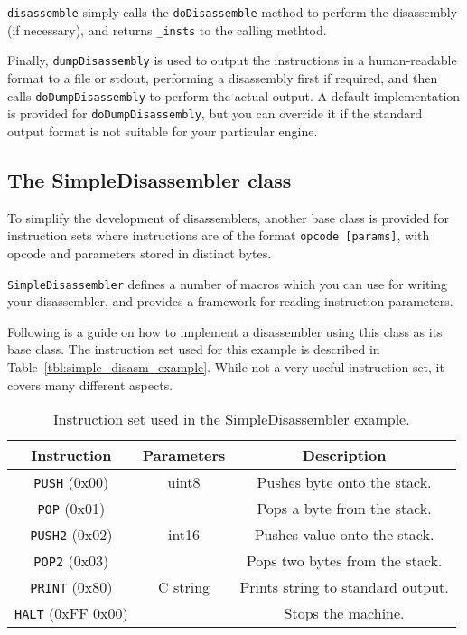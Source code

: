 \verb+disassemble+ simply calls the \verb+doDisassemble+ method to perform the disassembly (if necessary), and returns \verb+_insts+ to the calling methtod.

Finally, \verb+dumpDisassembly+ is used to output the instructions in a human-readable format to a file or stdout, performing a disassembly first if required, and then calls \verb+doDumpDisassembly+ to perform the actual output. A default implementation is provided for \verb+doDumpDisassembly+, but you can override it if the standard output format is not suitable for your particular engine.

\subsection{The SimpleDisassembler class}
To simplify the development of disassemblers, another base class is provided for instruction sets where instructions are of the format \verb+opcode [params]+, with opcode and parameters stored in distinct bytes.

\verb+SimpleDisassembler+ defines a number of macros which you can use for writing your disassembler, and provides a framework for reading instruction parameters.

Following is a guide on how to implement a disassembler using this class as its base class. The instruction set used for this example is described in Table~\vref{tbl:simple_disasm_example}. While not a very useful instruction set, it covers many different aspects.

\begin{table}[!hpbt]
\centering
\begin{tabular}{c | c | c}
Instruction & Parameters & Description \\
\hline
\verb+PUSH+ (0x00) & uint8 & Pushes byte onto the stack.\\
\verb+POP+ (0x01) & &  Pops a byte from the stack. \\
\verb+PUSH2+ (0x02) & int16 & Pushes value onto the stack.\\
\verb+POP2+ (0x03) & &  Pops two bytes from the stack. \\
\verb+PRINT+ (0x80) & C string & Prints string to standard output. \\
\verb+HALT+ (0xFF 0x00) & & Stops the machine.
\end{tabular}
\caption{Instruction set used in the SimpleDisassembler example.}
\label{tbl:simple_disasm_example}
\end{table}


